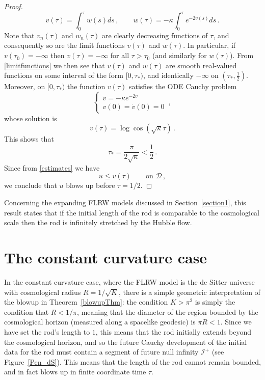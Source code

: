 \documentclass[10pt]{amsart}
\begin{document}
\begin{proof}
\begin{equation} \label{limitfunctions}
v(\tau) = \int_0^\tau w(s) ds \, , \qquad w(\tau) = - \kappa \int_0^\tau e^{-2v(s)} ds \, .
\end{equation}
Note that $v_n(\tau)$ and $w_n(\tau)$ are clearly decreasing functions of $\tau$, and consequently so are the limit functions $v(\tau)$ and $w(\tau)$. In particular, if $v(\tau_0)=-\infty$ then $v(\tau)=-\infty$ for all $\tau> \tau_0$ (and similarly for $w(\tau)$). From \eqref{limitfunctions} we then see that $v(\tau)$ and $w(\tau)$ are smooth real-valued functions on some interval of the form $[0,\tau_*)$, and identically $-\infty$ on $(\tau_*,\frac12)$. Moreover, on  $[0,\tau_*)$ the function $v(\tau)$ satisfies the ODE Cauchy problem
\begin{equation}
\begin{cases}
\ddot{v} = - \kappa e^{- 2v} \\
v(0)=\dot{v}(0)=0
\end{cases} \, ,
\end{equation}
whose solution is
\begin{equation}
v(\tau) = \log \cos \left( \sqrt{\kappa} \tau \right) \, .
\end{equation}
This shows that
\begin{equation}
\tau_* = \frac{\pi}{2\sqrt{\kappa}} < \frac12 \, .
\end{equation}
Since from \eqref{estimates} we have
\begin{equation}
u \leq v(\tau) \qquad \text{on } \mathcal{D} \, ,
\end{equation}
we conclude that $u$ blows up before $\tau = 1/2$.
\end{proof}

Concerning the expanding FLRW models discussed in Section~\ref{section1}, this result states that if the initial length of the rod is comparable to the cosmological scale then the rod is infinitely stretched by the Hubble flow.
%
%
\section{The constant curvature case}\label{section4}
%
In the constant curvature case, where the FLRW model is the de Sitter universe with cosmological radius $R = 1/\sqrt{K}$, there is a simple geometric interpretation of the blowup in Theorem~\ref{blowupThm}: the condition $K > \pi^2$ is simply the condition that $R < 1/\pi$, meaning that the diameter of the region bounded by the cosmological horizon (measured along a spacelike geodesic) is $\pi R < 1$. Since we have set the rod's length to $1$, this means that the rod initially extends beyond the cosmological horizon, and so the future Cauchy development of the initial data for the rod must contain a segment of future null infinity $\mathscr{I^+}$ (see Figure~\ref{Pen_dS}). This means that the length of the rod cannot remain bounded, and in fact blows up in finite coordinate time $\tau$.
\end{document}
